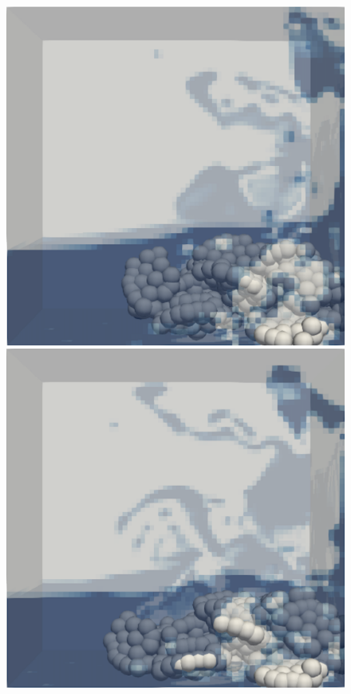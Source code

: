 \begin{figure}[H]
\begin{minipage}{.4\textwidth}
    \end{minipage}
    \newline
    \begin{minipage}{.4\textwidth}
        \centering
        \includegraphics[width=\linewidth]{Images/chap4/landslide_5.png}
    \end{minipage}%
    \hspace{0.06\textwidth}
    \begin{minipage}{.4\textwidth}
        \centering
        \includegraphics[width=\linewidth]{Images/chap4/landslide_6.png}

\end{minipage}
\end{figure}
